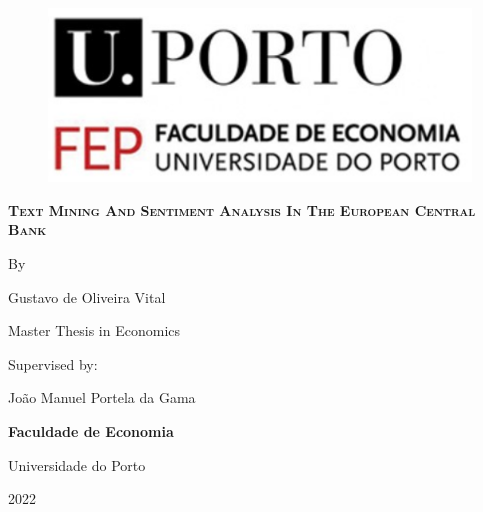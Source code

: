 \date{}
\begin{titlepage}
\begin{center}

\begin{figure}[ht!]
    \centering
    \includegraphics[scale=0.5]{images/FEP.PNG}
\end{figure}

\vspace*{0.7in}
{\LARGE \textbf{ {\scshape Text Mining And Sentiment Analysis In The European Central Bank}}}
\par
\vspace{0.4in}
{\large By}
\par
\vspace{0.4in}
{\large Gustavo de Oliveira Vital}
\par
\vspace{1in}
{\large Master Thesis in Economics}
\par
\vspace{0.8in}
\end{center}
{\large Supervised by:} \\ 
\par
{\large João Manuel Portela da Gama}
\par
\vspace{0.10in}
\vspace{1in}
\begin{center}
{\large \textbf{Faculdade de Economia}}
\par
\vspace{0.10in}
{\large Universidade do Porto}
\par
\vspace{0.2in}
{\large 2022}
\end{center}
\end{titlepage}

